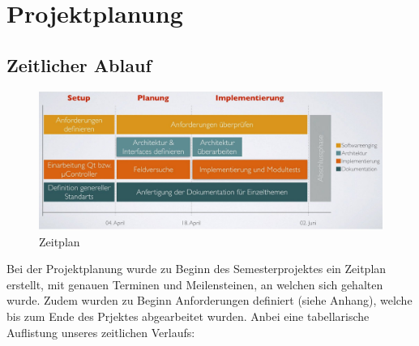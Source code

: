 \chapter{Projektplanung}
\section{Zeitlicher Ablauf}
\begin{figure}[h]
\begin{center}
  \includegraphics[width=13cm]{content/pictures/Zeitplan.jpg}
  \caption{Zeitplan}
  \label{Zeitplan}
\end{center}
\end{figure}
Bei der Projektplanung wurde zu Beginn des Semesterprojektes ein Zeitplan erstellt, mit genauen Terminen und 
Meilensteinen, an welchen sich gehalten wurde. Zudem wurden zu Beginn Anforderungen definiert (siehe Anhang), 
welche bis zum Ende des Prjektes abgearbeitet wurden.
Anbei eine tabellarische Auflistung unseres zeitlichen Verlaufs:

